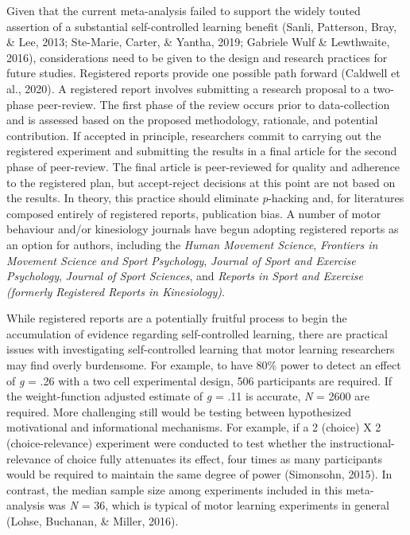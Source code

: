 \documentclass[
  english,
  man,floatsintext]{apa7}
\begin{document}
Given that the current meta-analysis failed to support the widely touted assertion of a substantial self-controlled learning benefit (Sanli, Patterson, Bray, \& Lee, 2013; Ste-Marie, Carter, \& Yantha, 2019; Gabriele Wulf \& Lewthwaite, 2016), considerations need to be given to the design and research practices for future studies. Registered reports provide one possible path forward (Caldwell et al., 2020). A registered report involves submitting a research proposal to a two-phase peer-review. The first phase of the review occurs prior to data-collection and is assessed based on the proposed methodology, rationale, and potential contribution. If accepted in principle, researchers commit to carrying out the registered experiment and submitting the results in a final article for the second phase of peer-review. The final article is peer-reviewed for quality and adherence to the registered plan, but accept-reject decisions at this point are not based on the results. In theory, this practice should eliminate \emph{p}-hacking and, for literatures composed entirely of registered reports, publication bias. A number of motor behaviour and/or kinesiology journals have begun adopting registered reports as an option for authors, including the \emph{Human Movement Science}, \emph{Frontiers in Movement Science and Sport Psychology}, \emph{Journal of Sport and Exercise Psychology}, \emph{Journal of Sport Sciences}, and \emph{Reports in Sport and Exercise (formerly Registered Reports in Kinesiology)}.

While registered reports are a potentially fruitful process to begin the accumulation of evidence regarding self-controlled learning, there are practical issues with investigating self-controlled learning that motor learning researchers may find overly burdensome. For example, to have 80\% power to detect an effect of \emph{g} = .26 with a two cell experimental design, 506 participants are required. If the weight-function adjusted estimate of \emph{g} = .11 is accurate, \emph{N} = 2600 are required. More challenging still would be testing between hypothesized motivational and informational mechanisms. For example, if a 2 (choice) X 2 (choice-relevance) experiment were conducted to test whether the instructional-relevance of choice fully attenuates its effect, four times as many participants would be required to maintain the same degree of power (Simonsohn, 2015). In contrast, the median sample size among experiments included in this meta-analysis was \emph{N} = 36, which is typical of motor learning experiments in general (Lohse, Buchanan, \& Miller, 2016).
\end{document}
